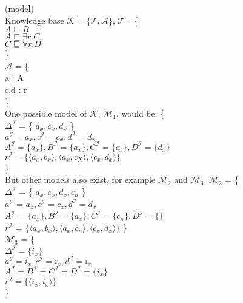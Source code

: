 \begin{myex} (model) \\

\noindent Knowledge base $\mathcal{K} = \{ \mathcal{T} , \mathcal{A} \}$, 
$ \mathcal{T} $= \{ \\
\indent $A \sqsubseteq B$ \\
\indent $A \sqsubseteq	\exists r.C$ \\
\indent $C \sqsubseteq \forall r.D$\\
\}\\
$ \mathcal{A} $ = \{  \\
\indent a : A \\
\indent c,d : r \\
\} 
\\
One possible model of $\mathcal{K}$, $\mathcal{M}_1$, would be: \{ \\
\indent $\Delta ^\mathcal{I}$ = \{ $a_x, c_x, d_x$ \} \\
\indent $a^\mathcal{I} = a_x, c^\mathcal{I} = c_x, d^\mathcal{I} = d_x$\\
\indent $A^\mathcal{I} = \{a_x\}, B^\mathcal{I} = \{a_x\}, C^\mathcal{I} = \{c_x\}, D^\mathcal{I} = \{d_x\} $\\
\indent $r^\mathcal{I} = \{ \langle a_x,b_x\rangle , \langle a_x,c_X \rangle, \langle c_x,d_x \rangle \} $ \\
  		\} \\
But other models also exist, for example $\mathcal{M}_2$ and $\mathcal{M}_3$.
$\mathcal{M}_2$ = \{  \\
\indent$ \Delta ^\mathcal{I}$ = \{ $a_x, c_x, d_x, c_n$ \} \\ 
\indent$a^\mathcal{I} $ = $a_x, c^\mathcal{I} = c_x, d^\mathcal{I} = d_x$ \\
\indent$A^\mathcal{I}$ = $\{a_x\}, B^\mathcal{I} = \{a_x\}, C^\mathcal{I} = \{c_n\}, D^\mathcal{I} = \{ \} $ \\
\indent$r^\mathcal{I}$ = $\{ \langle a_x,b_x\rangle , \langle a_x,c_n \rangle, \langle c_x,d_x \rangle \} $
\} \\
$\mathcal{M}_3$ = \{ \\
\indent $\Delta ^\mathcal{I} = \{ i_x\}     $\\
 \indent $a^\mathcal{I} = i_x, c^\mathcal{I} = i_x, d^\mathcal{I} = i_x $\\
\indent $A^\mathcal{I} = B^\mathcal{I} = C^\mathcal{I} = D^\mathcal{I} = \{i_x\}$\\
\indent $r^\mathcal{I} = \{ \langle i_x, i_x \rangle \}$\\
\}
\end{myex}

